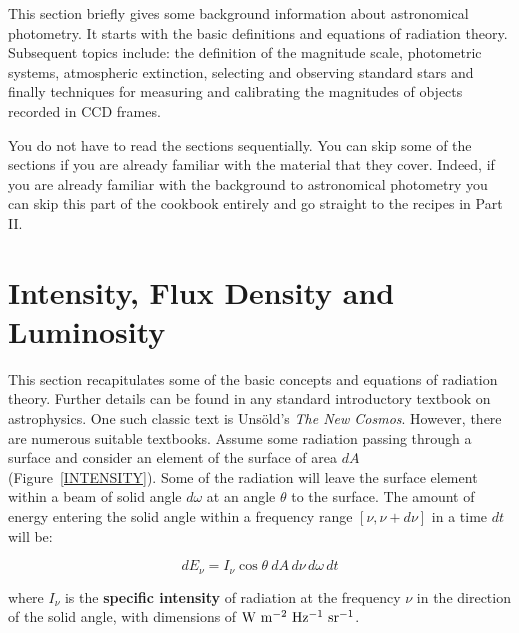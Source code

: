 \documentclass[twoside,11pt,nolof]{starlink}
\begin{document}
This section briefly gives some background information about
astronomical photometry.  It starts with the basic definitions and
equations of radiation theory.  Subsequent topics include: the
definition of the magnitude scale, photometric systems, atmospheric
extinction, selecting and observing standard stars and finally
techniques for measuring and calibrating the magnitudes of objects
recorded in CCD frames.

You do not have to read the sections sequentially.  You can skip some
of the sections if you are already familiar with the material that they
cover.  Indeed, if you are already familiar with the background to
astronomical photometry you can skip this part of the cookbook entirely
and go straight to the recipes in Part II.


\section{\label{IFDL}Intensity, Flux Density and Luminosity}

This section recapitulates some of the basic concepts and equations
of radiation theory.  Further details can be found in any standard
introductory textbook on astrophysics.  One such classic text is
Uns\"{o}ld's \textit{The New Cosmos}\/\cite{UNSOLD67}.  However, there are
numerous suitable textbooks.  Assume some radiation passing
through a surface and consider an element of the surface of area $dA$
(Figure~\ref{INTENSITY}).  Some of the radiation will leave the surface
element within a beam of solid angle $d\omega$ at an angle $\theta$ to
the surface.  The amount of energy entering the solid angle within a
frequency range $[ \nu, \nu+d\nu ]$ in a time $dt$ will be:

\begin{equation}
dE_{\nu} = I_{\nu} \cos \theta\: dA\, d\nu\, d\omega\, dt
\end{equation}

where $I_\nu$ is the \textbf{specific intensity} of radiation at the
frequency $\nu$ in the direction of the solid angle, with dimensions
of ${\rm W~m^{-2}~Hz^{-1}~sr^{-1}}$.
\end{document}
